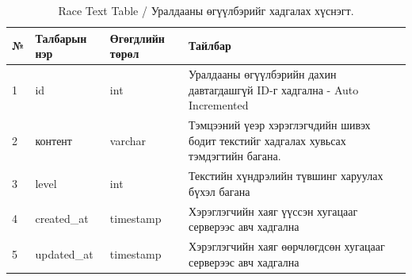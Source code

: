\begin{table}[h]
	\caption{Race Text Table / Уралдааны өгүүлбэрийг хадгалах хүснэгт.}
	\begin{tabular}{|l|l|l|p{8cm}|}
		\hline
		№ & Талбарын нэр & Өгөгдлийн төрөл & Тайлбар                                                                               \\ \hline
		1 & id           & int             & Уралдааны өгүүлбэрийн дахин давтагдашгүй ID-г хадгална - Auto Incremented             \\ \hline
		2 & контент      & varchar         & Тэмцээний үеэр хэрэглэгчдийн шивэх бодит текстийг хадгалах хувьсах тэмдэгтийн багана. \\ \hline
		3 & level        & int             & Текстийн хүндрэлийн түвшинг харуулах бүхэл багана                                     \\ \hline
		4 & created\_at  & timestamp       & Хэрэглэгчийн хаяг үүссэн хугацааг серверээс авч хадгална                              \\ \hline
		5 & updated\_at  & timestamp       & Хэрэглэгчийн хаяг өөрчлөгдсөн хугацааг серверээс авч хадгална                         \\ \hline
	\end{tabular}
\end{table}


\clearpage





